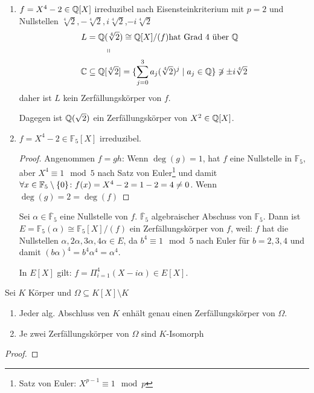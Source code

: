 \documentclass[../main.tex]{subfiles}
\begin{document}
\begin{example}
    \begin{enumerate}[label=\alph*)]
        \item $f=X^4 -2 \in \mathbb{Q}[X]$ irreduzibel nach Eisensteinkriterium mit $p=2$ und Nullstellen $\sqrt[4]{2},-\sqrt[4]{2},i\sqrt[4]{2}$,$-i\sqrt[4]{2}$
        \begin{align*}
            L=\mathbb{Q}&(\sqrt[4]{2}) \cong \mathbb{Q}[X]/(f) \text{hat Grad 4 über }\mathbb{Q}\\
            &\shortparallel\\
            \mathbb{C}\subseteq\mathbb{Q}&[\sqrt[4]{2}] = \{\sum_{j=0}^{3} a_j (\sqrt[4]{2})^j\mid a_j \in \mathbb{Q}\} \not\owns \pm i \sqrt[4]{2}
        \end{align*}
        daher ist $L$ kein Zerfällungskörper von $f$.

        Dagegen ist $\mathbb{Q}(\sqrt{2})$ ein Zerfällungskörper von $X^2 \in \mathbb{Q}[X]$.
        \item $f=X^4-2 \in \mathbb{F}_5[X]$ irreduzibel.
        \begin{proof}
            Angenommen $f=gh$: 
            Wenn $\deg(g)=1$, hat $f$ eine Nullstelle in $\mathbb{F}_5$, aber $X^4 \equiv 1 \mod{5}$ nach Satz von Euler\footnote{Satz von Euler: $X^{p-1} \equiv 1 \mod{p}$} und damit $\forall x\in \mathbb{F}_5\setminus\{0\}\colon f(x)=X^4-2=1-2=4\neq0$.
            Wenn $\deg(g)= 2 = \deg(f)$ 
        \end{proof}
        Sei $\alpha\in \overline{\mathbb{F}}_5$ eine Nullstelle von $f$. $\overline{\mathbb{F}}_5$ algebraischer Abschuss von $\mathbb{F}_5$.
        Dann ist $E = \mathbb{F}_5(\alpha) \cong \mathbb{F}_5[X]/(f)$ ein Zerfällungskörper von $f$, weil:
        $f$ hat die Nullstellen $\alpha, 2\alpha, 3\alpha, 4\alpha \in E$, da $b^4\equiv 1 \mod{5}$ nach Euler für $b=2,3,4$ und damit $(b\alpha)^4 = b^4\alpha^4=\alpha^4$.

        In $E[X]$ gilt: $f = \Pi_{i=1}^4 ( X-i\alpha) \in E[X]$.
    \end{enumerate}
\end{example}

\begin{theorem}
    Sei $K$ Körper und $\Omega\subseteq K[X]\setminus K$
    \begin{enumerate}[label=\alph*)]
        \item Jeder alg. Abschluss ven $K$ enhält genau einen Zerfällungskörper von $\Omega$.
        \item Je zwei Zerfällungskörper von $\Omega$ sind $K$-Isomorph
    \end{enumerate}
\end{theorem}
\begin{proof}
    \TODO
\end{proof}
\end{document}
